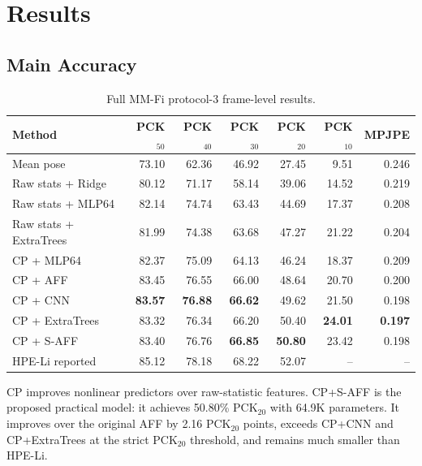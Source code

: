 \documentclass[10pt,conference]{IEEEtran}
\begin{document}
\section{Results}

\subsection{Main Accuracy}

\begin{table}[t]
\centering
\caption{Full MM-Fi protocol-3 frame-level results.}
\label{tab:main}
\begin{tabular}{lrrrrrr}
\toprule
Method & PCK$_{50}$ & PCK$_{40}$ & PCK$_{30}$ & PCK$_{20}$ & PCK$_{10}$ & MPJPE \\
\midrule
Mean pose & 73.10 & 62.36 & 46.92 & 27.45 & 9.51 & 0.246 \\
Raw stats + Ridge & 80.12 & 71.17 & 58.14 & 39.06 & 14.52 & 0.219 \\
Raw stats + MLP64 & 82.14 & 74.74 & 63.43 & 44.69 & 17.37 & 0.208 \\
Raw stats + ExtraTrees & 81.99 & 74.38 & 63.68 & 47.27 & 21.22 & 0.204 \\
CP + MLP64 & 82.37 & 75.09 & 64.13 & 46.24 & 18.37 & 0.209 \\
CP + AFF & 83.45 & 76.55 & 66.00 & 48.64 & 20.70 & 0.200 \\
CP + CNN & \textbf{83.57} & \textbf{76.88} & \textbf{66.62} & 49.62 & 21.50 & 0.198 \\
CP + ExtraTrees & 83.32 & 76.34 & 66.20 & 50.40 & \textbf{24.01} & \textbf{0.197} \\
CP + S-AFF & 83.40 & 76.76 & \textbf{66.85} & \textbf{50.80} & 23.42 & 0.198 \\
HPE-Li reported & 85.12 & 78.18 & 68.22 & 52.07 & -- & -- \\
\bottomrule
\end{tabular}
\end{table}

CP improves nonlinear predictors over raw-statistic features. CP+S-AFF is the proposed practical model: it achieves 50.80\% PCK$_{20}$ with 64.9K parameters. It improves over the original AFF by 2.16 PCK$_{20}$ points, exceeds CP+CNN and CP+ExtraTrees at the strict PCK$_{20}$ threshold, and remains much smaller than HPE-Li.
\end{document}

